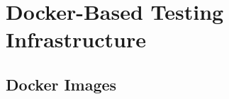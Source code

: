 \chapter{Docker-Based Testing Infrastructure}
\label{sec:docker}


\section{Docker Images}
\label{sec:docker-images}








